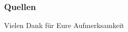 \documentclass[presentation, shownotes]{beamer}
\begin{document}
\begin{frame}
\frametitle{Quellen}
\printbibliography
\end{frame}



\begin{frame}
\centering
\Huge{Vielen Dank für Eure Aufmerksamkeit}
\end{frame}

\end{document}
